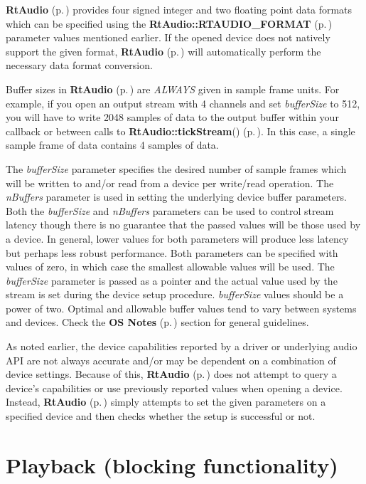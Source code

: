 {\bf Rt\-Audio} {\rm (p.\,\pageref{classRtAudio})} provides four signed integer and two floating point data formats which can be specified using the {\bf Rt\-Audio::RTAUDIO\_\-FORMAT} {\rm (p.\,\pageref{classRtAudio_s0})} parameter values mentioned earlier. If the opened device does not natively support the given format, {\bf Rt\-Audio} {\rm (p.\,\pageref{classRtAudio})} will automatically perform the necessary data format conversion.

Buffer sizes in {\bf Rt\-Audio} {\rm (p.\,\pageref{classRtAudio})} are {\em ALWAYS} given in sample frame units. For example, if you open an output stream with 4 channels and set {\em buffer\-Size} to 512, you will have to write 2048 samples of data to the output buffer within your callback or between calls to {\bf Rt\-Audio::tick\-Stream}() {\rm (p.\,\pageref{classRtAudio_a9})}. In this case, a single sample frame of data contains 4 samples of data.

The {\em buffer\-Size} parameter specifies the desired number of sample frames which will be written to and/or read from a device per write/read operation. The {\em n\-Buffers} parameter is used in setting the underlying device buffer parameters. Both the {\em buffer\-Size} and {\em n\-Buffers} parameters can be used to control stream latency though there is no guarantee that the passed values will be those used by a device. In general, lower values for both parameters will produce less latency but perhaps less robust performance. Both parameters can be specified with values of zero, in which case the smallest allowable values will be used. The {\em buffer\-Size} parameter is passed as a pointer and the actual value used by the stream is set during the device setup procedure. {\em buffer\-Size} values should be a power of two. Optimal and allowable buffer values tend to vary between systems and devices. Check the {\bf OS Notes} {\rm (p.\,\pageref{osnotes})} section for general guidelines.

As noted earlier, the device capabilities reported by a driver or underlying audio API are not always accurate and/or may be dependent on a combination of device settings. Because of this, {\bf Rt\-Audio} {\rm (p.\,\pageref{classRtAudio})} does not attempt to query a device's capabilities or use previously reported values when opening a device. Instead, {\bf Rt\-Audio} {\rm (p.\,\pageref{classRtAudio})} simply attempts to set the given parameters on a specified device and then checks whether the setup is successful or not.

\section{Playback (blocking functionality)}\label{playbackb}


